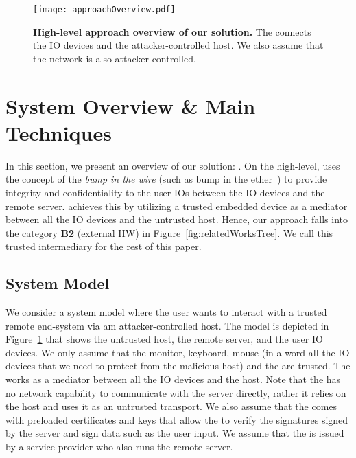 \begin{figure}[t]
\centering
\texttt{[image: approachOverview.pdf]}
\caption{\textbf{High-level approach overview of our solution.}  The \device connects the IO devices and the attacker-controlled host. We also assume that the network is also attacker-controlled.}
\spacesave
\label{fig:approachOverview}
\centering
\end{figure}

\section{System Overview \& Main Techniques}
\label{sec:approach}

In this section, we present an overview of our solution: \name. On the high-level, \name uses the concept of the \emph{bump in the wire} (such as bump in the ether~\cite{McCPerRei2006}) to provide integrity and confidentiality to the user IO{}s between the IO devices and the remote server. \name achieves this by utilizing a trusted embedded device as a mediator between all the IO devices and the untrusted host. Hence, our approach falls into the category \textbf{B2} (external HW) in Figure~\ref{fig:relatedWorksTree}. We call this trusted intermediary \device for the rest of this paper.   %




\subsection{System Model}
\label{sec:approach:systemAttackerModel}

We consider a system model where the user wants to interact with a trusted remote end-system via am attacker-controlled host. The model is depicted in Figure~\ref{fig:approachOverview} that shows the untrusted host, the remote server, and the user IO devices. We only assume that the monitor, keyboard, mouse (in a word all the IO devices that we need to protect from the malicious host) and the \device are trusted. The \device works as a mediator between all the IO devices and the host. Note that the \device has no network capability to communicate with the server directly, rather it relies on the host and uses it as an untrusted transport. We also assume that the \device comes with preloaded certificates and keys that allow the \device to verify the signatures signed by the server and sign data such as the user input. We assume that the \device is issued by a service provider who also runs the remote server.


